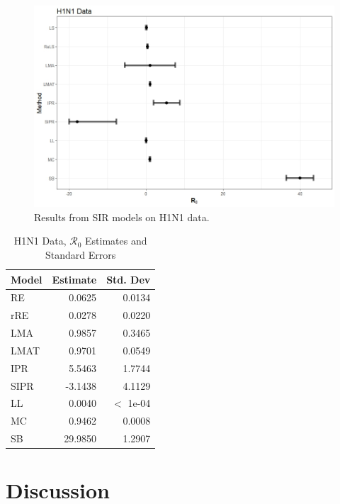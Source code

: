 \documentclass[12pt]{article}
\newcommand{\rr}{\ensuremath{\mathcal{R}_0}}
\begin{document}
\begin{figure}[H]
	\centering
	\includegraphics[width=\textwidth]{images/h1n1.jpeg}
	\caption{Results from SIR models on H1N1 data.}
\end{figure}

\begin{table}[H]
	
	
	\centering
	\begin{tabular}[t]{l|r|r}
		\hline
		Model & Estimate & Std. Dev\\
		\hline
		RE & 0.0625 & 0.0134 \\
		\hline
		rRE & 0.0278 & 0.0220 \\
		\hline
		LMA & 0.9857 & 0.3465 \\
		\hline
		LMAT & 0.9701 & 0.0549 \\
		\hline
		IPR & 5.5463 & 1.7744 \\
		\hline
		SIPR & -3.1438 & 4.1129 \\
		\hline
		LL & 0.0040 & $<$ 1e-04\\
		\hline
		MC & 0.9462 & 0.0008 \\
		\hline
		SB & 29.9850 & 1.2907 \\
		\hline
	\end{tabular}
	\caption{H1N1 Data, $\rr$ Estimates and Standard Errors}
\end{table}
      

      
\section{Discussion}\label{sec:discussion}

\end{document}

